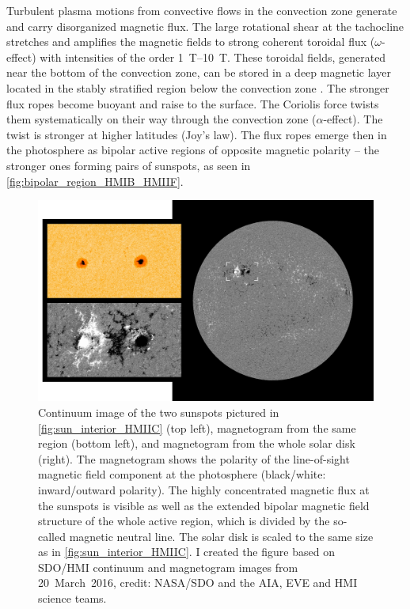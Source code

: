 Turbulent plasma motions from convective flows in the convection zone generate and carry disorganized magnetic flux. The large rotational shear at the tachocline stretches and amplifies the magnetic fields to strong coherent toroidal flux ($\omega$-effect) with intensities of the order \SIrange{1}{10}{\tesla}. These toroidal fields, generated near the bottom of the convection zone, can be stored in a deep magnetic layer located in the stably stratified region below the convection zone \citep{Ossendrijver2003}. The stronger flux ropes become buoyant and raise to the surface. The Coriolis force twists them systematically on their way through the convection zone ($\alpha$-effect). The twist is stronger at higher latitudes (Joy's law). The flux ropes emerge then in the photosphere as bipolar active regions of opposite magnetic polarity -- the stronger ones forming pairs of sunspots, as seen in \autoref{fig:bipolar_region_HMIB_HMIIF}.
\begin{figure}[htb]
	\centering
	\includegraphics[width=\textwidth]{figures_of_mine/schemata/bipolar_region_HMIB_HMIIF.png}
	\caption[I created the figure based on SDO/HMI continuum and magnetogram images from 20~March~2016, credit: NASA/SDO and the AIA, EVE and HMI science teams.]
	{Continuum image of the two sunspots pictured in \autoref{fig:sun_interior_HMIIC} (top left), magnetogram from the same region (bottom left), and magnetogram from the whole solar disk (right). The magnetogram shows the polarity of the line-of-sight magnetic field component at the photosphere (black/white: inward/outward polarity). The highly concentrated magnetic flux at the sunspots is visible as well as the extended bipolar magnetic field structure of the whole active region, which is divided by the so-called magnetic neutral line. The solar disk is scaled to the same size as in \autoref{fig:sun_interior_HMIIC}. I created the figure based on SDO/HMI continuum and magnetogram images from 20~March~2016, credit: NASA/SDO and the AIA, EVE and HMI science teams.}
	\label{fig:bipolar_region_HMIB_HMIIF}
\end{figure}
